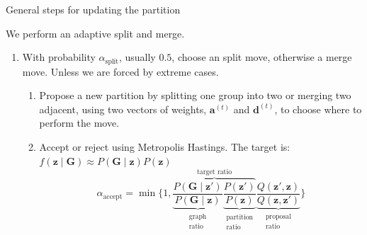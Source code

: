 \begin{frame}{General steps for updating the partition}
    
    We perform an adaptive \alert{split and merge}.

    \begin{enumerate}
        \item With probability $\alpha_{\text{split}}$, usually $0.5$, choose an \alert{split move}, otherwise a \alert{merge move}. Unless we are forced by extreme cases.
        \begin{enumerate}
            \item Propose a new partition by splitting one group into two or merging two adjacent, using two vectors of \alert{weights}, $\bm{a}^{(t)}$ and $\bm{d}^{(t)}$, to choose where to perform the move.
            \item Accept or reject using\vphantom{un banale} Metropolis Hastings. The target is:
            $f(\bm{z} \mid \bm{G}) \approx P(\bm{G} \mid \bm{z}) P(\bm{z})$
            \pause
            \begin{equation*}
                \alpha_{\text{accept}} = \min
                \bigg\{1,
                \overbrace{
                \underbrace{\frac{P(\bm{G} \mid \bm{z}')}{P(\bm{G} \mid \bm{z})}}_{\substack{\text{graph}\\\text{ratio}}}
                \underbrace{\frac{P(\bm{z}')}{P(\bm{z})}}_{\substack{\text{partition}\\\text{ratio}}}
                }^{\text{target ratio}}
                \underbrace{\frac{Q(\bm{z}',\bm{z})}{Q(\bm{z},\bm{z}')}}_{\substack{\text{proposal}\\\text{ratio}}}
                \bigg\}
            \end{equation*}
        \end{enumerate}
        
    \end{enumerate}

\end{frame}



